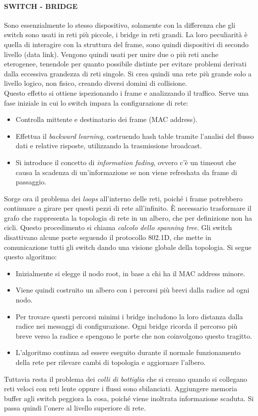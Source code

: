 \documentclass[10pt,a4paper,twoside]{article}
\begin{document}
\paragraph{SWITCH - BRIDGE} Sono essenzialmente lo stesso dispositivo, solamente con la differenza che gli switch sono usati in reti più piccole, i bridge in reti grandi. La loro peculiarità è quella di interagire con la struttura del frame, sono quindi dispositivi di secondo livello (data link). Vengono quindi usati per unire due o più reti anche eterogenee, tenendole per quanto possibile distinte per evitare problemi derivati dalla eccessiva grandezza di reti singole. Si crea quindi una rete più grande solo a livello logico, non fisico, creando diversi domini di collisione.\\
Questo effetto si ottiene ispezionando i frame e analizzando il traffico. Serve una fase iniziale in cui lo switch impara la configurazione di rete:
\begin{itemize}
\item Controlla mittente e destinatario dei frame (MAC address).
\item Effettua il \textit{backward learning}, costruendo hash table tramite l'analisi del flusso dati e relative risposte, utilizzando la trasmissione broadcast.
\item Si introduce il concetto di \textit{information fading}, ovvero c'è un timeout che causa la scadenza di un'informazione se non viene refreshata da frame di passaggio.
\end{itemize}
Sorge ora il problema dei \textit{loops} all'interno delle reti, poiché i frame potrebbero continuare a girare per questi pezzi di rete all'infinito. È necessario trasformare il grafo che rappresenta la topologia di rete in un albero, che per definizione non ha cicli. Questo procedimento si chiama \textit{calcolo dello spanning tree}. Gli switch disattivano alcune porte seguendo il protocollo 802.1D, che mette in comunicazione tutti gli switch dando una visione globale della topologia. Si segue questo algoritmo:
\begin{itemize}
\item Inizialmente si elegge il nodo root, in base a chi ha il MAC address minore.
\item Viene quindi costruito un albero con i percorsi più brevi dalla radice ad ogni nodo.
\item Per trovare questi percorsi minimi i bridge includono la loro distanza dalla radice nei messaggi di configurazione. Ogni bridge ricorda il percorso più breve verso la radice e spengono le porte che non coinvolgono questo tragitto.
\item L'algoritmo continua ad essere eseguito durante il normale funzionamento della rete per rilevare cambi di topologia e aggiornare l'albero.
\end{itemize}
Tuttavia resta il problema dei \textit{colli di bottiglia} che si creano quando si collegano reti veloci con reti lente oppure i flussi sono sbilanciati. Aggiungere memoria buffer agli switch peggiora la cosa, poiché viene inoltrata informazione scaduta. Si passa quindi l'onere al livello superiore di rete.
\end{document}
